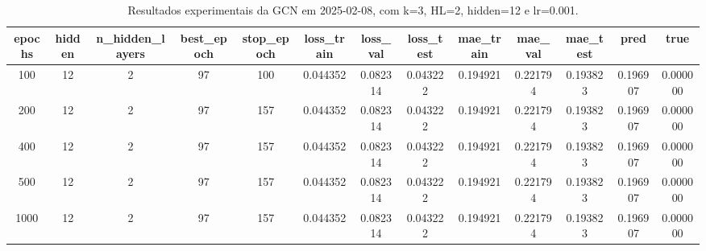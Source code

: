 \begin{table}[h]
\centering
\caption{Resultados experimentais da GCN em 2025-02-08, com k=3, HL=2, hidden=12 e lr=0.001.}
\label{tab:gcn_results_k3_hl2_h12_d20250208}
\begin{tabular}{ccccccccccccc}
\toprule
epochs & hidden & n\_hidden\_layers & best\_epoch & stop\_epoch & loss\_train & loss\_val & loss\_test & mae\_train & mae\_val & mae\_test & pred & true \\
\midrule
100 & 12 & 2 & 97 & 100 & 0.044352 & 0.082314 & 0.043222 & 0.194921 & 0.221794 & 0.193823 & 0.196907 & 0.000000 \\
200 & 12 & 2 & 97 & 157 & 0.044352 & 0.082314 & 0.043222 & 0.194921 & 0.221794 & 0.193823 & 0.196907 & 0.000000 \\
400 & 12 & 2 & 97 & 157 & 0.044352 & 0.082314 & 0.043222 & 0.194921 & 0.221794 & 0.193823 & 0.196907 & 0.000000 \\
500 & 12 & 2 & 97 & 157 & 0.044352 & 0.082314 & 0.043222 & 0.194921 & 0.221794 & 0.193823 & 0.196907 & 0.000000 \\
1000 & 12 & 2 & 97 & 157 & 0.044352 & 0.082314 & 0.043222 & 0.194921 & 0.221794 & 0.193823 & 0.196907 & 0.000000 \\
\bottomrule
\end{tabular}
\end{table}
